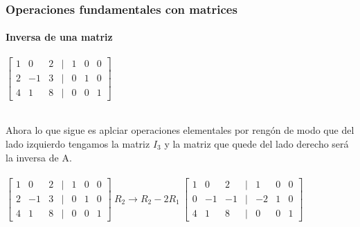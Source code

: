 \documentclass[11pt]{beamer}
\begin{document}
\begin{frame}
\frametitle{Operaciones fundamentales con matrices}
\framesubtitle{Inversa de una matriz}
\begin{center}
${\displaystyle {\begin{bmatrix}1&0&2&|&1&0&0\\2&-1&3&|&0&1&0\\4&1&8&|&0&0&1\end{bmatrix}}}$\\ \hspace{0cm} \\
\end{center}
Ahora lo que sigue es aplciar operaciones elementales por rengón de modo que del lado izquierdo tengamos la matriz $I_3$ y la matriz que quede del lado derecho será la inversa de A.\\ \hspace{0cm} \\
${\displaystyle {\begin{bmatrix}1&0&2&|&1&0&0\\2&-1&3&|&0&1&0\\4&1&8&|&0&0&1\end{bmatrix}}} 
~ R_2 \rightarrow R_2 -2R_1 ~ {\displaystyle {\begin{bmatrix}1&0&2&|&1&0&0\\0&-1&-1&|&-2&1&0\\4&1&8&|&0&0&1\end{bmatrix}}}$\\ \hspace{0cm} \\
\end{frame}
\end{document}
